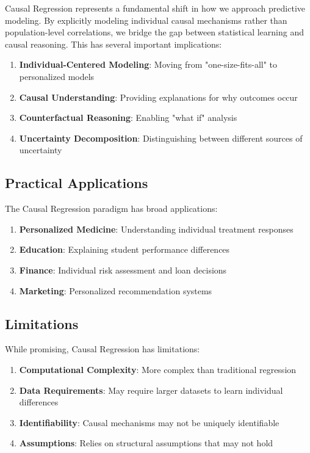 \documentclass[conference]{IEEEtran}
\begin{document}
Causal Regression represents a fundamental shift in how we approach predictive modeling. By explicitly modeling individual causal mechanisms rather than population-level correlations, we bridge the gap between statistical learning and causal reasoning. This has several important implications:

\begin{enumerate}
\item \textbf{Individual-Centered Modeling}: Moving from "one-size-fits-all" to personalized models
\item \textbf{Causal Understanding}: Providing explanations for why outcomes occur
\item \textbf{Counterfactual Reasoning}: Enabling "what if" analysis
\item \textbf{Uncertainty Decomposition}: Distinguishing between different sources of uncertainty
\end{enumerate}

\subsection{Practical Applications}

The Causal Regression paradigm has broad applications:

\begin{enumerate}
\item \textbf{Personalized Medicine}: Understanding individual treatment responses
\item \textbf{Education}: Explaining student performance differences
\item \textbf{Finance}: Individual risk assessment and loan decisions
\item \textbf{Marketing}: Personalized recommendation systems
\end{enumerate}

\subsection{Limitations}

While promising, Causal Regression has limitations:

\begin{enumerate}
\item \textbf{Computational Complexity}: More complex than traditional regression
\item \textbf{Data Requirements}: May require larger datasets to learn individual differences
\item \textbf{Identifiability}: Causal mechanisms may not be uniquely identifiable
\item \textbf{Assumptions}: Relies on structural assumptions that may not hold
\end{enumerate}
\end{document}
